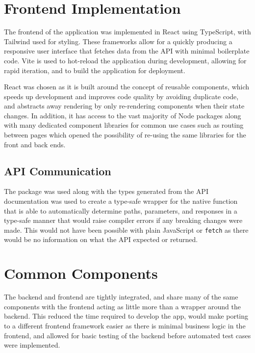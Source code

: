\section{Frontend Implementation}

The frontend of the application was implemented in React using TypeScript, with Tailwind used for styling. These
frameworks allow for a quickly producing a responsive user interface that fetches data from the API with minimal
boilerplate code. Vite is used to hot-reload the application during development, allowing for rapid iteration, and
to build the application for deployment.

React was chosen as it is built around the concept of reusable components, which speeds up development and
improves code quality by avoiding duplicate code,~\cite{hordijk_harmfulness_2009} and abstracts away rendering
by only re-rendering components when their state changes. In addition, it has access to the vast majority of
Node packages along with many dedicated component libraries for common use cases such as routing between pages
which opened the possibility of re-using the same libraries for the front and back ends.~\cite{saks_javascript_2019}

\subsection{API Communication}
The  package was used along with the types generated from the API documentation was
used to create a type-safe wrapper for the native  function that is able to automatically
determine paths, parameters, and responses in a type-safe manner that would raise compiler errors if any breaking
changes were made. This would not have been possible with plain JavaScript or \texttt{fetch} as there would be no
information on what the API expected or returned.

\section{Common Components}

The backend and frontend are tightly integrated, and share many of the same components with the frontend acting
as little more than a wrapper around the backend. This reduced the time required to develop the app, would
make porting to a different frontend framework easier as there is minimal business logic in the frontend, and
allowed for basic testing of the backend before automated test cases were implemented.

